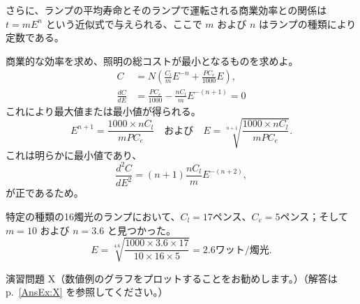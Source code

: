 \documentclass[a4paper,11pt,openany]{ltjsbook}
\newcommand{\Pageref}[2][p.]{#1~\ref{#2}}
\begin{document}
さらに、ランプの平均寿命とそのランプで運転される商業効率との関係は $t = mE^n$ という近似式で与えられる、ここで $m$ および $n$ はランプの種類により定数である。

商業的な効率を求め、照明の総コストが最小となるものを求めよ。
\begin{align*}
C &= N\left(\frac{C_l}{m} E^{-n} + \frac{PC_e}{1000} E\right), \\
\frac{dC}{dE} &= \frac{PC_e}{1000} - \frac{nC_l}{m} E^{-(n+1)} = 0
\end{align*}
これにより最大値または最小値が得られる。
\[
E^{n+1} = \frac{1000 \times  nC_l}{mPC_e}\quad \text{および}\quad
E = \sqrt[n+1]{\frac{1000 \times  nC_l}{mPC_e}}.
\]
これは明らかに最小値であり、
\[
\frac{d^2C}{dE^2} = (n + 1) \frac{nC_l}{m} E^{-(n+2)},
\]
が正であるため。

特定の種類の16燭光のランプにおいて、$C_l=17$ペンス、$C_e=5$ペンス；そして $m=10$ および $n=3.6$ と見つかった。
\[
E = \sqrt[4.6]{\frac{1000 \times  3.6 \times  17}{10 \times  16 \times  5}}
  = 2.6\text{ワット/燭光}.
\]

演習問題 X（数値例のグラフをプロットすることをお勧めします。）（解答は \Pageref{AnsEx:X} を参照してください。）
\end{document}
